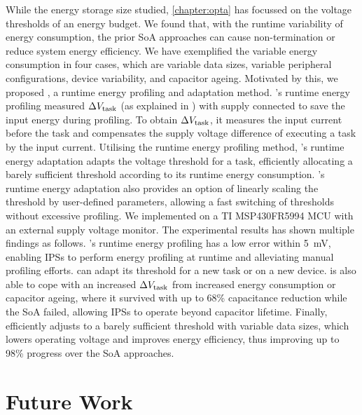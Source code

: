 While the energy storage size studied, \cref{chapter:opta} has focussed on the voltage thresholds of an energy budget. 
We found that, with the runtime variability of energy consumption, the prior SoA approaches can cause non-termination or reduce system energy efficiency.
We have exemplified the variable energy consumption in four cases, which are variable data sizes, variable peripheral configurations, device variability, and capacitor ageing. 
Motivated by this, we proposed \nn{}, a runtime energy profiling and adaptation method. 
\nn{}'s runtime energy profiling measured $\Delta V_{\text{task}}$ (as explained in ) with supply connected to save the input energy during profiling.
To obtain $\Delta V_{\text{task}}$, it measures the input current before the task and compensates the supply voltage difference of executing a task by the input current.
Utilising the runtime energy profiling method, \nn{}'s runtime energy adaptation adapts the voltage threshold for a task, efficiently allocating a barely sufficient threshold according to its runtime energy consumption. 
\nn{}'s runtime energy adaptation also provides an option of linearly scaling the threshold by user-defined parameters, allowing a fast switching of thresholds without excessive profiling. 
We implemented \nn{} on a TI MSP430FR5994 MCU with an external supply voltage monitor. 
The experimental results has shown multiple findings as follows.
\nn{}'s runtime energy profiling has a low error within \SI{5}{\milli\volt}, enabling IPSs to perform energy profiling at runtime and alleviating manual profiling efforts.
\nn{} can adapt its threshold for a new task or on a new device. 
\nn{} is also able to cope with an increased $\Delta V_{\text{task}}$ from increased energy consumption or capacitor ageing, where it survived with up to 68\% capacitance reduction while the SoA failed, allowing IPSs to operate beyond capacitor lifetime. 
Finally, \nn{} efficiently adjusts to a barely sufficient threshold with variable data sizes, which lowers operating voltage and improves energy efficiency, thus improving up to 98\% progress over the SoA approaches.


\section{Future Work}

